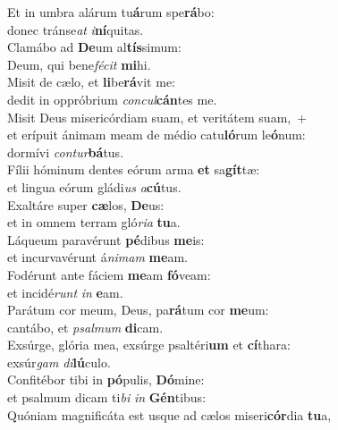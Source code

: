 \evenverse Et in umbra alárum tu\textbf{á}rum spe\textbf{rá}bo:~\*\\
\evenverse donec tránse\textit{at} \textit{i}\textbf{ní}quitas.\\
\oddverse Clamábo ad \textbf{De}um al\textbf{tís}simum:~\*\\
\oddverse Deum, qui bene\textit{fé}\textit{cit} \textbf{mi}hi.\\
\evenverse Misit de cælo, et \textbf{li}be\textbf{rá}vit me:~\*\\
\evenverse dedit in oppróbrium \textit{con}\textit{cul}\textbf{cán}tes me.\\
\oddverse Misit Deus misericórdiam suam, et veritátem suam,~+\\
\oddverse  et erípuit ánimam meam de médio catu\textbf{ló}rum le\textbf{ó}num:~\*\\
\oddverse dormívi \textit{con}\textit{tur}\textbf{bá}tus.\\
\evenverse Fílii hóminum dentes eórum arma \textbf{et} sa\textbf{gít}tæ:~\*\\
\evenverse et lingua eórum gládi\textit{us} \textit{a}\textbf{cú}tus.\\
\oddverse Exaltáre super \textbf{cæ}los, \textbf{De}us:~\*\\
\oddverse et in omnem terram gló\textit{ri}\textit{a} \textbf{tu}a.\\
\evenverse Láqueum paravérunt \textbf{pé}dibus \textbf{me}is:~\*\\
\evenverse et incurvavérunt á\textit{ni}\textit{mam} \textbf{me}am.\\
\oddverse Fodérunt ante fáciem \textbf{me}am \textbf{fó}veam:~\*\\
\oddverse et incidé\textit{runt} \textit{in} \textbf{e}am.\\
\evenverse Parátum cor meum, Deus, pa\textbf{rá}tum cor \textbf{me}um:~\*\\
\evenverse cantábo, et \textit{psal}\textit{mum} \textbf{di}cam.\\
\oddverse Exsúrge, glória mea, exsúrge psaltéri\textbf{um} et \textbf{cí}thara:~\*\\
\oddverse exsúr\textit{gam} \textit{di}\textbf{lú}culo.\\
\evenverse Confitébor tibi in \textbf{pó}pulis, \textbf{Dó}mine:~\*\\
\evenverse et psalmum dicam ti\textit{bi} \textit{in} \textbf{Gén}tibus:\\
\oddverse Quóniam magnificáta est usque ad cælos miseri\textbf{cór}dia \textbf{tu}a,~\*\\
